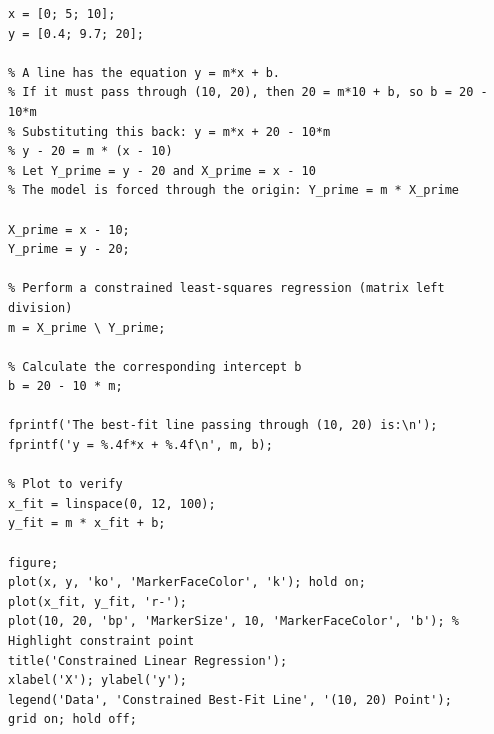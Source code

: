 \begin{lstlisting}
x = [0; 5; 10];
y = [0.4; 9.7; 20];

% A line has the equation y = m*x + b.
% If it must pass through (10, 20), then 20 = m*10 + b, so b = 20 - 10*m
% Substituting this back: y = m*x + 20 - 10*m
% y - 20 = m * (x - 10)
% Let Y_prime = y - 20 and X_prime = x - 10
% The model is forced through the origin: Y_prime = m * X_prime

X_prime = x - 10;
Y_prime = y - 20;

% Perform a constrained least-squares regression (matrix left division)
m = X_prime \ Y_prime;

% Calculate the corresponding intercept b
b = 20 - 10 * m;

fprintf('The best-fit line passing through (10, 20) is:\n');
fprintf('y = %.4f*x + %.4f\n', m, b);

% Plot to verify
x_fit = linspace(0, 12, 100);
y_fit = m * x_fit + b;

figure;
plot(x, y, 'ko', 'MarkerFaceColor', 'k'); hold on;
plot(x_fit, y_fit, 'r-');
plot(10, 20, 'bp', 'MarkerSize', 10, 'MarkerFaceColor', 'b'); % Highlight constraint point
title('Constrained Linear Regression');
xlabel('X'); ylabel('y');
legend('Data', 'Constrained Best-Fit Line', '(10, 20) Point');
grid on; hold off;
\end{lstlisting}
